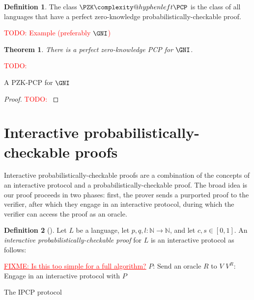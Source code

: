 \documentclass[english,12pt]{reedthesis}
\makeatletter
\theoremstyle{plain}
\newtheorem{thm}{Theorem}[section]
\theoremstyle{definition}
\newtheorem{defn}[defn]{Definition}
\theoremstyle{remark}
\newcommand{\PZKPCP}{%
  \PZK\complexity@hyphenleft\PCP
}
\newcommand{\TODO}[1]{\textcolor{red}{TODO: #1}}
\newcommand{\FIXME}[1]{\textcolor{red}{\ul{FIXME: #1}}}
\makeatother
\begin{document}
\begin{defn}\label{def:pzkpcp-class}\index{PZK-PCP@$\PZKPCP$}
  The class $\PZKPCP$ is the class of all languages that have a perfect
  zero-knowledge probabilistically-checkable proof.
\end{defn}

\TODO{Example (preferably $\GNI$)}

\begin{thm}\label{thm:gni-pzkpcp}
  There is a perfect zero-knowledge PCP for $\GNI$.
\end{thm}

\begin{algorithm}[htbp]
  \TODO{}
  \caption{A PZK-PCP for $\GNI$}\label{alg:gni-pzkpcp}
\end{algorithm}

\begin{proof}
  \TODO{}
\end{proof}

\section{Interactive probabilistically-checkable proofs}\label{sec:ipcp}

Interactive probabilistically-checkable proofs are a combination of the concepts
of an interactive protocol and a probabilistically-checkable proof. The broad
idea is our proof proceeds in two phases: first, the prover sends a purported
proof to the verifier, after which they engage in an interactive protocol,
during which the verifier can access the proof as an oracle.

\begin{defn}[{\cite[]{KR08}}]\label{def:ipcp}
  Let $L$ be a language, let $p, q, l\colon \mathbb{N} \rightarrow \mathbb{N}$, and let $c, s \in [0, 1]$. An
  \emph{interactive probabilistically-checkable proof} for $L$ is an interactive
  protocol as follows:

  \begin{algorithm}[H]
    \FIXME{Is this too simple for a full algorithm?}\;
    $P$: Send an oracle $R$ to $V$\;
    $V^{R}$: Engage in an interactive protocol with $P$\;
    \caption{The IPCP protocol}\label{alg:ipcp-protocol}
  \end{algorithm}
\end{defn}
\end{document}
